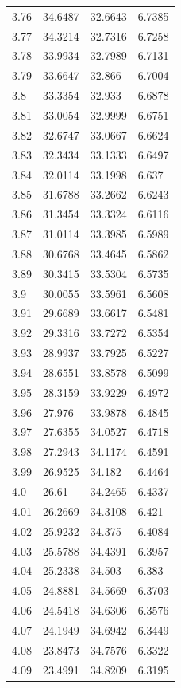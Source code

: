 \begin{tabular}{llll}
3.76 & 34.6487 & 32.6643 & 6.7385 \\
3.77 & 34.3214 & 32.7316 & 6.7258 \\
3.78 & 33.9934 & 32.7989 & 6.7131 \\
3.79 & 33.6647 & 32.866 & 6.7004 \\
3.8 & 33.3354 & 32.933 & 6.6878 \\
3.81 & 33.0054 & 32.9999 & 6.6751 \\
3.82 & 32.6747 & 33.0667 & 6.6624 \\
3.83 & 32.3434 & 33.1333 & 6.6497 \\
3.84 & 32.0114 & 33.1998 & 6.637 \\
3.85 & 31.6788 & 33.2662 & 6.6243 \\
3.86 & 31.3454 & 33.3324 & 6.6116 \\
3.87 & 31.0114 & 33.3985 & 6.5989 \\
3.88 & 30.6768 & 33.4645 & 6.5862 \\
3.89 & 30.3415 & 33.5304 & 6.5735 \\
3.9 & 30.0055 & 33.5961 & 6.5608 \\
3.91 & 29.6689 & 33.6617 & 6.5481 \\
3.92 & 29.3316 & 33.7272 & 6.5354 \\
3.93 & 28.9937 & 33.7925 & 6.5227 \\
3.94 & 28.6551 & 33.8578 & 6.5099 \\
3.95 & 28.3159 & 33.9229 & 6.4972 \\
3.96 & 27.976 & 33.9878 & 6.4845 \\
3.97 & 27.6355 & 34.0527 & 6.4718 \\
3.98 & 27.2943 & 34.1174 & 6.4591 \\
3.99 & 26.9525 & 34.182 & 6.4464 \\
4.0 & 26.61 & 34.2465 & 6.4337 \\
4.01 & 26.2669 & 34.3108 & 6.421 \\
4.02 & 25.9232 & 34.375 & 6.4084 \\
4.03 & 25.5788 & 34.4391 & 6.3957 \\
4.04 & 25.2338 & 34.503 & 6.383 \\
4.05 & 24.8881 & 34.5669 & 6.3703 \\
4.06 & 24.5418 & 34.6306 & 6.3576 \\
4.07 & 24.1949 & 34.6942 & 6.3449 \\
4.08 & 23.8473 & 34.7576 & 6.3322 \\
4.09 & 23.4991 & 34.8209 & 6.3195 \\

\end{tabular}
